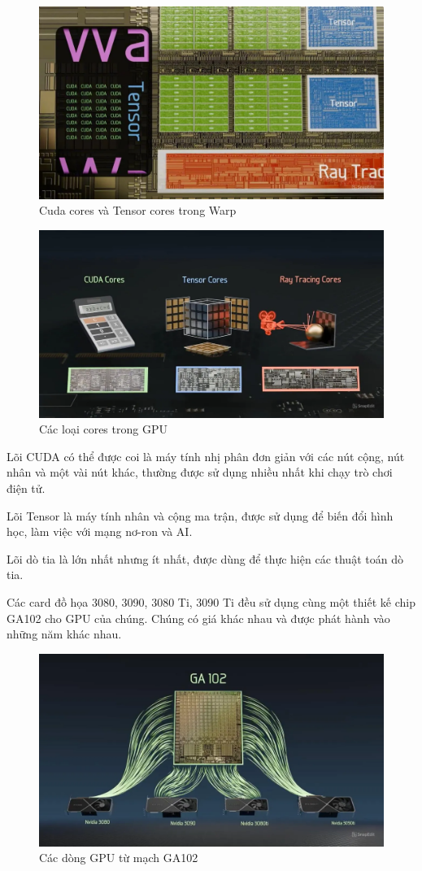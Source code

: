\documentclass[a4paper]{article}
\begin{document}
\begin{figure}[H]
    \centering
    \includegraphics[width=0.75\linewidth]{assets/gpu5.png}
    \caption{Cuda cores và Tensor cores trong Warp}
    \label{fig:enter-label}
\end{figure}
    
\begin{figure}[H]
    \centering
    \includegraphics[width=0.75\linewidth]{assets/gpu6.png}
    \caption{Các loại cores trong GPU}
    \label{fig:enter-label}
\end{figure}

Lõi CUDA có thể được coi là máy tính nhị phân đơn giản với các nút cộng, nút nhân và một vài nút khác, thường được sử dụng nhiều nhất khi chạy trò chơi điện tử.
    
Lõi Tensor là máy tính nhân và cộng ma trận, được sử dụng để biến đổi hình học, làm việc với mạng nơ-ron và AI.
    
Lõi dò tia là lớn nhất nhưng ít nhất, được dùng để thực hiện các thuật toán dò tia.
    
Các card đồ họa 3080, 3090, 3080 Ti, 3090 Ti đều sử dụng cùng một thiết kế chip GA102 cho GPU của chúng. Chúng có giá khác nhau và được phát hành vào những năm khác nhau.
    
\begin{figure}
    \centering
    \includegraphics[width=0.75\linewidth]{assets/gpu7.png}
    \caption{Các dòng GPU từ mạch GA102}
    \label{fig:enter-label}
\end{figure}
    
\end{document}
